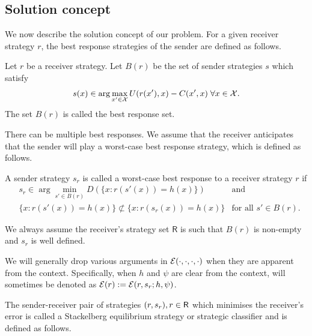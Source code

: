 \subsection{Solution concept}
We now describe the solution concept of our problem. For a given receiver strategy $r$, the best response strategies of the sender are defined as follows.

\begin{defn}\label{defn:Best response} Let $r$ be a receiver strategy. Let $B(r)$ be the set of sender strategies $s$ which satisfy
	\begin{equation*}
		s(x) \in \arg\max_{x' \in \mathcal{X}} U(r(x'),x) - C(x',x) \; \forall x \in \mathcal{X}.
	\end{equation*}
	The set $B(r)$ is called the best response set.
\end{defn}

There can be multiple best responses. We assume that the receiver anticipates that the sender will play a worst-case best response strategy, which is defined as follows.
\begin{defn}\label{def:Worst case best response}
	A sender strategy $s_r$ is called a worst-case best response to a receiver strategy $r$ if
	\begin{equation*}
		\begin{aligned}
			&s_r \in  \arg \min_{s' \in B(r)}D(\{x:r(s'(x)) = h(x)\}) &\text{and}\\ &\{x:r(s'(x)) = h(x)\} \not\subset \{x:r(s_r(x)) = h(x)\} &\text{for all } s' \in B(r).
\end{aligned}
\end{equation*}

\end{defn}
\begin{rem}\label{rem:disclaimer}
	We always assume the receiver's strategy set $\mathsf{R}$ is such that $B(r)$ is non-empty and $s_r$ is well defined.
\end{rem}

\begin{notn}
	We will generally drop various arguments in $\mathcal{E}(\cdot,\cdot,\cdot,\cdot)$ when they are apparent from the context. Specifically, when $h$ and $\psi$ are clear from the context, will sometimes be denoted as $\mathcal{E}(r):= \mathcal{E}(r,s_r;h,\psi)$.
\end{notn}
The sender-receiver pair of strategies $(r,s_r), r \in \mathsf{R}$ which minimises the receiver's error is called a Stackelberg equilibrium strategy or strategic classifier and is defined as follows.

